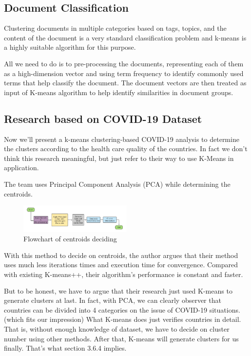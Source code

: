 \documentclass[11pt]{article}
\begin{document}
\subsection{Document Classification}
Clustering documents in multiple categories based on tags, topics, and the content of the document is a very standard classification problem and k-means is a highly suitable algorithm for this purpose.\cite{kmeansapplication}
\par All we need to do is to pre-processing the documents, representing each of them as a high-dimension vector and using term frequency to identify commonly used terms that help classify the document.
The document vectors are then treated as input of K-means algorithm to help identify similarities in document groups.\cite{Jacob2016ImprovedCO}

\subsection{Research based on COVID-19 Dataset}
Now we'll present a k-means clustering-based COVID-19 analysis to determine the clusters according to the health care quality of the countries. In fact we don't think this research meaningful, but just refer to their way to use K-Means in application.\cite{zubair2020efficient} \par
The team uses Principal Component Analysis (PCA)  while determining the centroids.
\begin{figure}[H] %
  \centering %
  \includegraphics[width=0.5\textwidth]{COVID19.png} %
  \caption{Flowchart of centroids deciding} %
  \label{Fig.centroids} %
\end{figure}
With this method to decide on centroids, the author argues that their method uses much less iterations times and execution time for convergence. Compared with existing K-means++, their algorithm's performance is constant and faster. \par
But to be honest, we have to argue that their research just used K-means to generate clusters at last. In fact, with PCA, we can clearly observer that countries can be divided into 4 categories on the issue of COVID-19 situations.(which fits our impression) What K-means does just verifies countries in detail. That is, without enough knowledge of dataset, we have to decide on cluster number using other methods. After that, K-means will generate clusters for us finally. That's what section 3.6.4 implies.
\end{document}
